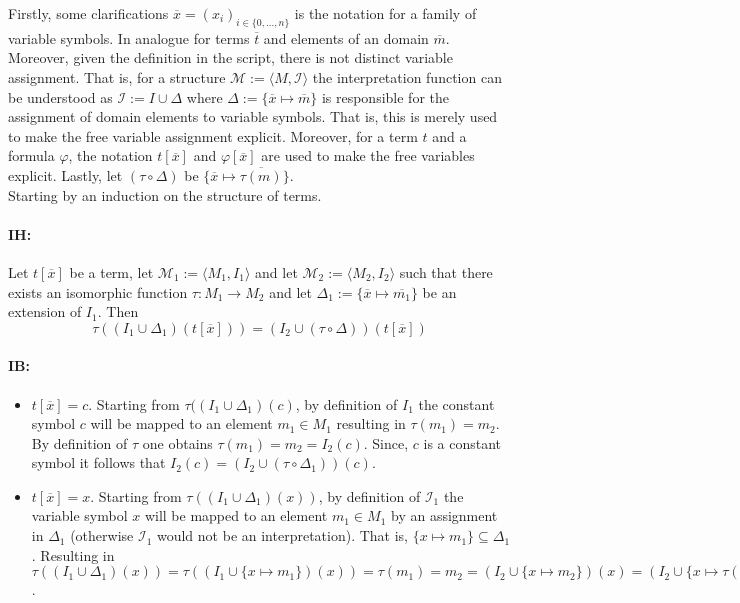 \documentclass[11pt,a4paper]{article}
\begin{document}
Firstly, some clarifications $\overline{x}=(x_i)_{i \in \{0,\dots,n \}}$ is the notation for a family of variable symbols. In analogue for terms $\overline{t}$ and elements of an domain $\overline{m}$. Moreover, given the definition in the script, there is not distinct variable assignment. That is, for a structure $\mathcal{M}:= \langle M , \mathcal{I}\rangle$ the interpretation function can be understood as $\mathcal{I} := I \cup \Delta$ where $\Delta:= \{\overline{x} \mapsto \overline{m}\}$ is responsible for the assignment of domain elements to variable symbols. That is, this is merely used to make the free variable assignment explicit.
Moreover, for a term $t$ and a formula $\varphi$, the notation $t[\overline{x}]$ and $\varphi[\overline{x}]$ are used to make the free variables explicit. Lastly, let $(\tau \circ \Delta )$ be $\{\overline{x} \mapsto \overline{\tau(m)}\}$.\\



Starting by an induction on the structure of terms.
\paragraph*{IH:} Let $t[\overline{x}]$ be a term, let $\mathcal{M}_1 := \langle M_1, I_1\rangle$ and let $\mathcal{M}_2 := \langle M_2, I_2\rangle$ such that there exists an isomorphic function $\tau : M_1 \to M_2$ and let $\Delta_1:= \{\overline{x} \mapsto \overline{m_1}\}$ be an extension of $I_1$. Then 
\begin{equation*}
\tau((I_1 \cup \Delta_1)(t[\overline{x}]))= (I_2 \cup (\tau \circ \Delta))(t[\overline{x}])
\end{equation*}

\paragraph*{IB:}
\begin{itemize}[leftmargin=*]
\item $t[\overline{x}]= c$. Starting from $\tau((I_1 \cup \Delta_1)(c)$, by definition of $I_1$ the constant symbol $c$ will be mapped to an element $m_1 \in M_1$ resulting in $\tau(m_1)=m_2$. By  definition of $\tau$ one obtains $\tau(m_1)=m_2=I_2(c)$. Since, $c$ is a constant symbol it follows that $I_2(c) = (I_2\cup (\tau \circ \Delta_1))(c)$.\\

\item $t[\overline{x}]= x$. Starting from $\tau((I_1 \cup \Delta_1)(x))$, by definition of $\mathcal{I}_1$ the variable symbol $x$ will be mapped to an element $m_1 \in M_1$ by an assignment in $\Delta_1$ (otherwise $\mathcal{I}_1$ would not be an interpretation). That is, $\{x \mapsto m_1\} \subseteq \Delta_1$. Resulting in $\tau((I_1 \cup \Delta_1)(x)) = \tau((I_1 \cup \{x \mapsto m_1\})(x))= \tau(m_1)= m_2 = (I_2 \cup \{x \mapsto m_2\})(x) =  (I_2 \cup \{x \mapsto \tau(m_1)\})(x) = (I_2 \cup (\tau \circ \Delta_1))(x)$.
\end{itemize}
\end{document}
